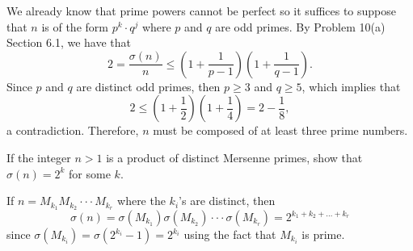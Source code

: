 \begin{solution}
    We already know that prime powers cannot be perfect so it suffices to suppose that $n$ is of the form $p^k \cdot q^j$ where $p$ and $q$ are odd primes. By Problem 10(a) Section 6.1, we have that
    $$2 = \frac{\sigma(n)}{n} \leq \left(1 + \frac{1}{p-1}\right)\left(1 + \frac{1}{q-1}\right).$$
    Since $p$ and $q$ are distinct odd primes, then $p \geq 3$ and $q \geq 5$, which implies that 
    $$2 \leq \left(1 + \frac{1}{2}\right)\left(1 + \frac{1}{4}\right) = 2 - \frac{1}{8},$$
    a contradiction. Therefore, $n$ must be composed of at least three prime numbers. \\
\end{solution}

\begin{exercise}
    If the integer $n > 1$ is a product of distinct Mersenne primes, show that $\sigma(n) = 2^k$ for some $k$. \\
\end{exercise}

\begin{solution}
    If $n = M_{k_1}M_{k_2} \cdot \cdot \cdot M_{k_r}$ where the $k_i$'s are distinct, then
    $$\sigma(n) = \sigma(M_{k_1})\sigma(M_{k_2})\cdot \cdot \cdot \sigma(M_{k_r}) = 2^{k_1+ k_2 + \dots + k_r}$$
    since $\sigma(M_{k_i}) = \sigma(2^{k_i} - 1) = 2^{k_i}$ using the fact that $M_{k_i}$ is prime.
\end{solution}